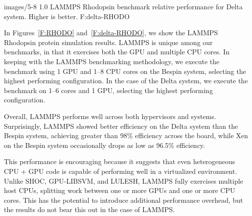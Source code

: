   {images/5-8}
  {1.0}
  {LAMMPS Rhodopsin benchmark relative performance for Delta system.  Higher is better.}
  {F:delta-RHODO} 





In Figures~\ref{F:RHODO} and~\ref{F:delta-RHODO}, we show the LAMMPS Rhodopsin protein simulation results.
LAMMPS is unique among our benchmarks, in that it exercises both the GPU and
multiple CPU cores.  In keeping with the LAMMPS benchmarking methodology, we
execute the benchmark using 1 GPU and 1--8 CPU cores
on the Bespin system,
selecting the highest performing configuration.  In the case of the Delta
system, we execute the benchmark on 1--6 cores and 1 GPU, selecting the highest
performing configuration.

Overall, LAMMPS performs well across both hypervisors and systems.
Surprisingly, LAMMPS showed better efficiency on the Delta system than the
Bespin system, achieving greater than 98\% efficiency across the board, while
Xen on the Bespin system occasionally drops as low as 96.5\% efficiency. 

This performance is encouraging because it suggests that even heterogeneous CPU
+ GPU code is capable of performing well in a virtualized environment.  Unlike
SHOC, GPU-LIBSVM, and LULESH, LAMMPS fully exercises multiple host CPUs,
splitting work between one or more GPUs and one or more CPU cores.  This has the
potential to introduce additional performance overhead, but the results do not
bear this out in the case of LAMMPS.  



